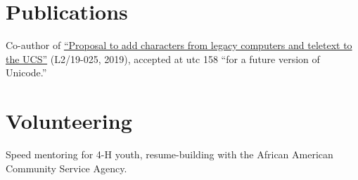 \documentclass{article}
\begin{document}





\section{Publications}

Co-author of
\href{https://www.unicode.org/L2/L2019/19025-terminals-prop.pdf}{``Proposal
to add characters from legacy computers and teletext to the UCS''}
(L2/19-025, 2019), accepted at \ac{utc} 158 ``for a future version of
Unicode.''

\section{Volunteering}

Speed mentoring for 4-H youth, resume-building with the African American
Community Service Agency.
\end{document}
